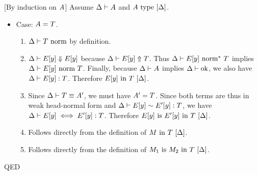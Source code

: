 \documentclass{article}
\theoremstyle{break}
\newcommand{\qed}{\mbox{QED}}
\newenvironment{proof}{\noindent{\bf Proof:}\hspace*{0.5em}}{\hspace*{\fill}\qed}
\begin{document}
\begin{proof}[By induction on $A$]
Assume $\Delta\vdash A$ and ${A}\mathrm{\ type\ }[\Delta]$.
\begin{itemize}
\item Case: $A = T$.
\begin{enumerate}
\item ${\Delta}\vdash{T}\mbox{\ norm}$ by definition.
\item $\Delta\vdash E[y] \Downarrow E[y]$ because
$\Delta\vdash E[y] \Uparrow T$.  Thus
${\Delta}\vdash{E[y]}\mbox{\ norm}^*\ {T}$ implies
${\Delta}\vdash{E[y]}\mbox{\ norm\ }{T}$.
Finally, because
$\Delta\vdash A$ implies ${\Delta}\vdash\mbox{ok}$, we also
have $\Delta\vdash E[y] : T$.  Therefore
${E[y]}\mathrm{\ in\ }{T}\ [\Delta]$.
\item Since $\Delta\vdash T \equiv A'$, we must have
$A' = T$.  Since both terms are thus in weak head-normal form
and $\Delta\vdash E[y] \sim E'[y] : T$, we
have $\Delta\vdash E[y] \iff E'[y] : T$.
Therefore
${E[y]}\mathrm{\ is\ }{E'[y]}\mathrm{\ in\ }{T}\ [\Delta]$.
\item Follows directly from the definition of 
${M}\mathrm{\ in\ }{T}\ [\Delta]$.
\item Follows directly from the definition of 
${M_1}\mathrm{\ is\ }{M_2}\mathrm{\ in\ }{T}\ [\Delta]$.
\end{enumerate}


\end{itemize}
\end{proof}
\end{document}
